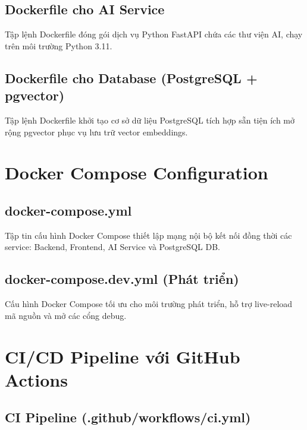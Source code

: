 \documentclass[12pt,a4paper]{report}
\begin{document}
\subsection{Dockerfile cho AI Service}

Tập lệnh Dockerfile đóng gói dịch vụ Python FastAPI chứa các thư viện AI, chạy trên môi trường Python 3.11.

\subsection{Dockerfile cho Database (PostgreSQL + pgvector)}

Tập lệnh Dockerfile khởi tạo cơ sở dữ liệu PostgreSQL tích hợp sẵn tiện ích mở rộng pgvector phục vụ lưu trữ vector embeddings.

\section{Docker Compose Configuration}

\subsection{docker-compose.yml}

Tập tin cấu hình Docker Compose thiết lập mạng nội bộ kết nối đồng thời các service: Backend, Frontend, AI Service và PostgreSQL DB.

\subsection{docker-compose.dev.yml (Phát triển)}

Cấu hình Docker Compose tối ưu cho môi trường phát triển, hỗ trợ live-reload mã nguồn và mở các cổng debug.

\section{CI/CD Pipeline với GitHub Actions}

\subsection{CI Pipeline (.github/workflows/ci.yml)}
\end{document}
